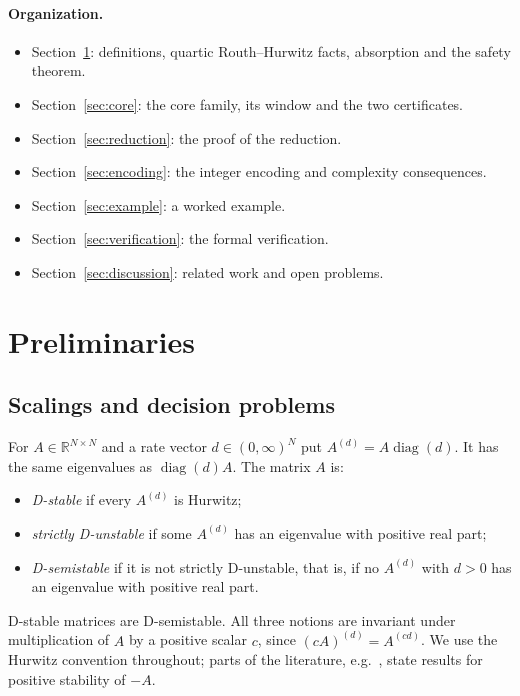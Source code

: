 \documentclass[11pt,a4paper]{article}
\theoremstyle{plain}
\theoremstyle{definition}
\theoremstyle{remark}
\newcommand{\R}{\mathbb{R}}
\newcommand{\diag}{\operatorname{diag}}
\newcommand{\scl}[2]{#1^{(#2)}}
\begin{document}
\paragraph{Organization.}
\begin{itemize}
\item Section~\ref{sec:prelim}: definitions, quartic Routh--Hurwitz facts, absorption
and the safety theorem.
\item Section~\ref{sec:core}: the core family, its window and the two certificates.
\item Section~\ref{sec:reduction}: the proof of the reduction.
\item Section~\ref{sec:encoding}: the integer encoding and complexity consequences.
\item Section~\ref{sec:example}: a worked example.
\item Section~\ref{sec:verification}: the formal verification.
\item Section~\ref{sec:discussion}: related work and open problems.
\end{itemize}

\section{Preliminaries}\label{sec:prelim}

\subsection{Scalings and decision problems}
For $A\in\R^{N\times N}$ and a rate vector $d\in(0,\infty)^N$ put
$\scl Ad=A\diag(d)$. It has the same eigenvalues as $\diag(d)A$. The matrix $A$ is:
\begin{itemize}
\item \emph{D-stable} if every $\scl Ad$ is Hurwitz;
\item \emph{strictly D-unstable} if some $\scl Ad$ has an eigenvalue with positive real part;
\item \emph{D-semistable} if it is not strictly D-unstable, that is, if no $\scl Ad$
with $d>0$ has an eigenvalue with positive real part.
\end{itemize}
D-stable matrices are D-semistable. All three notions are invariant under
multiplication of $A$ by a positive scalar $c$, since $\scl{(cA)}d=\scl A{cd}$. We use the
Hurwitz convention throughout; parts of the literature, e.g.~\cite{kushel2019},
state results for positive stability of $-A$.
\end{document}
